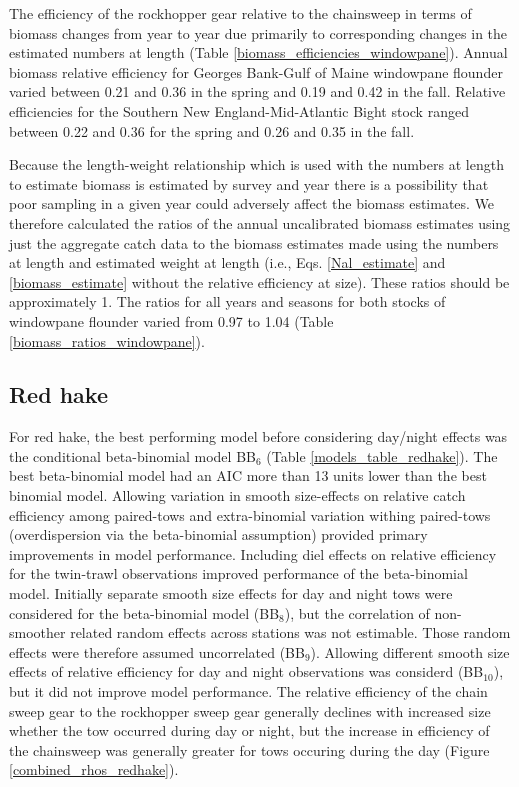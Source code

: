 \documentclass[]{article}
\begin{document}
The efficiency of the rockhopper gear relative to the chainsweep in
terms of biomass changes from year to year due primarily to
corresponding changes in the estimated numbers at length (Table
\ref{biomass_efficiencies_windowpane}). Annual biomass relative
efficiency for Georges Bank-Gulf of Maine windowpane flounder varied
between 0.21 and 0.36 in the spring and 0.19 and 0.42 in the fall.
Relative efficiencies for the Southern New England-Mid-Atlantic Bight
stock ranged between 0.22 and 0.36 for the spring and 0.26 and 0.35 in
the fall.

Because the length-weight relationship which is used with the numbers at
length to estimate biomass is estimated by survey and year there is a
possibility that poor sampling in a given year could adversely affect
the biomass estimates. We therefore calculated the ratios of the annual
uncalibrated biomass estimates using just the aggregate catch data to
the biomass estimates made using the numbers at length and estimated
weight at length (i.e., Eqs. \ref{Nal_estimate} and
\ref{biomass_estimate} without the relative efficiency at size). These
ratios should be approximately 1. The ratios for all years and seasons
for both stocks of windowpane flounder varied from 0.97 to 1.04 (Table
\ref{biomass_ratios_windowpane}).

\hypertarget{red-hake}{%
\subsection{Red hake}\label{red-hake}}

For red hake, the best performing model before considering day/night
effects was the conditional beta-binomial model BB\(_6\) (Table
\ref{models_table_redhake}). The best beta-binomial model had an AIC
more than 13 units lower than the best binomial model. Allowing
variation in smooth size-effects on relative catch efficiency among
paired-tows and extra-binomial variation withing paired-tows
(overdispersion via the beta-binomial assumption) provided primary
improvements in model performance. Including diel effects on relative
efficiency for the twin-trawl observations improved performance of the
beta-binomial model. Initially separate smooth size effects for day and
night tows were considered for the beta-binomial model (BB\(_8\)), but
the correlation of non-smoother related random effects across stations
was not estimable. Those random effects were therefore assumed
uncorrelated (BB\(_9\)). Allowing different smooth size effects of
relative efficiency for day and night observations was considerd
(BB\(_{10}\)), but it did not improve model performance. The relative
efficiency of the chain sweep gear to the rockhopper sweep gear
generally declines with increased size whether the tow occurred during
day or night, but the increase in efficiency of the chainsweep was
generally greater for tows occuring during the day (Figure
\ref{combined_rhos_redhake}).
\end{document}
